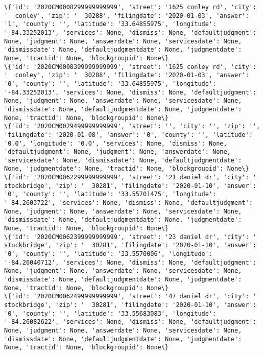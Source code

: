 \documentclass[11pt]{article}
\begin{document}
\begin{Verbatim}[commandchars=\\\{\}]
\{'id': '2020CM0008299999999999', 'street': '1625 conley rd', 'city': '  conley', 'zip': '  30288', 'filingdate': '2020-01-03', 'answer': '1', 'county': '', 'latitude': '33.64855975', 'longitude': '-84.33252013', 'services': None, 'dismiss': None, 'defaultjudgment': None, 'judgment': None, 'answerdate': None, 'servicesdate': None, 'dismissdate': None, 'defaultjudgmentdate': None, 'judgmentdate': None, 'tractid': None, 'blockgroupid': None\}
\{'id': '2020CM0008399999999999', 'street': '1625 conley rd', 'city': '  conley', 'zip': '  30288', 'filingdate': '2020-01-03', 'answer': '0', 'county': '', 'latitude': '33.64855975', 'longitude': '-84.33252013', 'services': None, 'dismiss': None, 'defaultjudgment': None, 'judgment': None, 'answerdate': None, 'servicesdate': None, 'dismissdate': None, 'defaultjudgmentdate': None, 'judgmentdate': None, 'tractid': None, 'blockgroupid': None\}
\{'id': '2020CM0029499999999999', 'street': '', 'city': '', 'zip': '', 'filingdate': '2020-01-08', 'answer': '0', 'county': '', 'latitude': '0.0', 'longitude': '0.0', 'services': None, 'dismiss': None, 'defaultjudgment': None, 'judgment': None, 'answerdate': None, 'servicesdate': None, 'dismissdate': None, 'defaultjudgmentdate': None, 'judgmentdate': None, 'tractid': None, 'blockgroupid': None\}
\{'id': '2020CM0062299999999999', 'street': '21 daniel dr', 'city': '  stockbridge', 'zip': '  30281', 'filingdate': '2020-01-10', 'answer': '0', 'county': '', 'latitude': '33.55701475', 'longitude': '-84.2603722', 'services': None, 'dismiss': None, 'defaultjudgment': None, 'judgment': None, 'answerdate': None, 'servicesdate': None, 'dismissdate': None, 'defaultjudgmentdate': None, 'judgmentdate': None, 'tractid': None, 'blockgroupid': None\}
\{'id': '2020CM0062399999999999', 'street': '23 daniel dr', 'city': '  stockbridge', 'zip': '  30281', 'filingdate': '2020-01-10', 'answer': '0', 'county': '', 'latitude': '33.5570006', 'longitude': '-84.26040712', 'services': None, 'dismiss': None, 'defaultjudgment': None, 'judgment': None, 'answerdate': None, 'servicesdate': None, 'dismissdate': None, 'defaultjudgmentdate': None, 'judgmentdate': None, 'tractid': None, 'blockgroupid': None\}
\{'id': '2020CM0062499999999999', 'street': '47 daniel dr', 'city': '  stockbridge', 'zip': '  30281', 'filingdate': '2020-01-10', 'answer': '0', 'county': '', 'latitude': '33.55683083', 'longitude': '-84.26082622', 'services': None, 'dismiss': None, 'defaultjudgment': None, 'judgment': None, 'answerdate': None, 'servicesdate': None, 'dismissdate': None, 'defaultjudgmentdate': None, 'judgmentdate': None, 'tractid': None, 'blockgroupid': None\}

\end{Verbatim}
\end{document}
